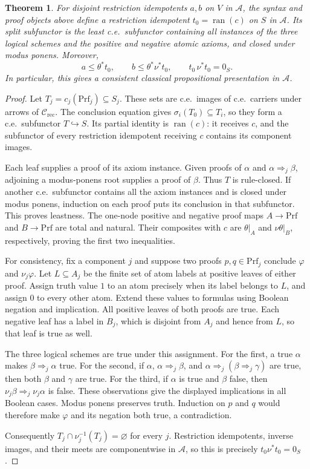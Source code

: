 \documentclass[11pt]{article}
\newtheorem{theorem}{Theorem}[section]
\newcommand{\ran}{\operatorname{ran}}
\begin{document}
\begin{theorem}\label{thm:fork-proof-presentation}
For disjoint restriction idempotents $a,b$ on $V$ in $\mathcal A$, the syntax and
proof objects above define a restriction idempotent $t_0=\ran(c)$ on $S$ in
$\mathcal A$. Its split subfunctor is the least c.e.\ subfunctor
containing all instances of the three logical schemes and the
positive and negative atomic axioms, and closed under modus ponens.
Moreover,
\[
 a\le\theta^*t_0,\qquad
 b\le\theta^*\nu^*t_0,\qquad
 t_0\,\nu^*t_0=0_S.
\]
In particular, this gives a consistent classical propositional
presentation in $\mathcal A$.
\end{theorem}
\begin{proof}
Let $T_j=c_j(\mathrm{Prf}_j)\subseteq S_j$.
These sets are c.e.\ images of c.e.\ carriers under
arrows of $\mathcal C_{\mathrm{rec}}$. The conclusion equation gives
$\sigma_i(T_0)\subseteq T_i$, so they form a c.e.\
subfunctor $T\hookrightarrow S$. Its partial identity is
$\ran(c)$: it receives $c$, and the subfunctor of every restriction
idempotent receiving $c$ contains its component images.

Each leaf supplies a proof of its axiom instance. Given proofs
of $\alpha$ and $\alpha\Rightarrow_j\beta$, adjoining a
modus-ponens root supplies a proof of $\beta$. Thus $T$ is
rule-closed. If another c.e.\ subfunctor contains all
the axiom instances and is closed under modus ponens, induction
on each proof puts its conclusion in that subfunctor. This
proves leastness. The one-node positive and negative proof maps
$A\to\mathrm{Prf}$ and $B\to\mathrm{Prf}$ are total and natural.
Their composites with $c$ are $\theta|_A$ and
$\nu\theta|_B$, respectively, proving the first two inequalities.

For consistency, fix a component $j$ and suppose two proofs
$p,q\in\mathrm{Prf}_j$ conclude $\varphi$ and $\nu_j\varphi$.
Let $L\subseteq A_j$ be the finite set of atom labels at
positive leaves of either proof. Assign truth value $1$ to an
atom precisely when its label belongs to $L$, and assign $0$
to every other atom. Extend these values to formulas using
Boolean negation and implication.
All positive leaves of both proofs are true. Each negative
leaf has a label in $B_j$, which is disjoint from $A_j$ and
hence from $L$, so that leaf is true as well.

The three logical schemes are true under this assignment.
For the first, a true $\alpha$ makes
$\beta\Rightarrow_j\alpha$ true. For the second, if
$\alpha$, $\alpha\Rightarrow_j\beta$, and
$\alpha\Rightarrow_j(\beta\Rightarrow_j\gamma)$ are true,
then both $\beta$ and $\gamma$ are true. For the third, if
$\alpha$ is true and $\beta$ false, then
$\nu_j\beta\Rightarrow_j\nu_j\alpha$ is false.
These observations give the displayed implications in all
Boolean cases. Modus ponens preserves truth. Induction on
$p$ and $q$ would therefore make $\varphi$ and its negation
both true, a contradiction.

Consequently $T_j\cap\nu_j^{-1}(T_j)=\varnothing$ for every
$j$. Restriction idempotents, inverse images, and their meets are componentwise
in $\mathcal A$, so this is precisely $t_0\nu^*t_0=0_S$.
\end{proof}
\end{document}
